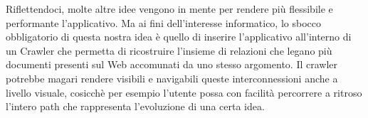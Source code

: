 Riflettendoci, molte altre idee vengono in mente per rendere più flessibile e performante l'applicativo. Ma ai fini dell'interesse informatico, lo sbocco obbligatorio di questa nostra idea è quello di inserire l'applicativo all'interno di un Crawler che permetta di ricostruire l'insieme di relazioni che legano più documenti presenti sul Web accomunati da uno stesso argomento. Il crawler potrebbe magari rendere visibili e navigabili queste interconnessioni anche a livello visuale, cosicchè per esempio l'utente possa con facilità percorrere a ritroso l'intero path che rappresenta l'evoluzione di una certa idea.
